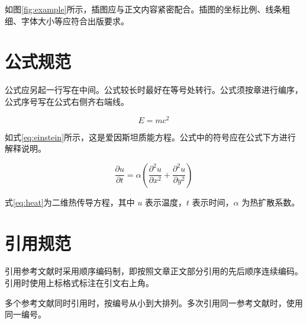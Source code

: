 如图\ref{fig:example}所示，插图应与正文内容紧密配合。插图的坐标比例、线条粗细、字体大小等应符合出版要求。

\section{公式规范}

公式应另起一行写在中间。公式较长时最好在等号处转行。公式须按章进行编序，公式序号写在公式右侧齐右端线。

\begin{equation}
  E = mc^2
  \label{eq:einstein}
\end{equation}

如式\eqref{eq:einstein}所示，这是爱因斯坦质能方程。公式中的符号应在公式下方进行解释说明。

\begin{equation}
  \frac{\partial u}{\partial t} = \alpha \left( \frac{\partial^2 u}{\partial x^2} + \frac{\partial^2 u}{\partial y^2} \right)
  \label{eq:heat}
\end{equation}

式\eqref{eq:heat}为二维热传导方程，其中 $u$ 表示温度，$t$ 表示时间，$\alpha$ 为热扩散系数。

\section{引用规范}

引用参考文献时采用顺序编码制，即按照文章正文部分引用的先后顺序连续编码。引用时使用上标格式标注在引文右上角。

多个参考文献同时引用时，按编号从小到大排列。多次引用同一参考文献时，使用同一编号。
